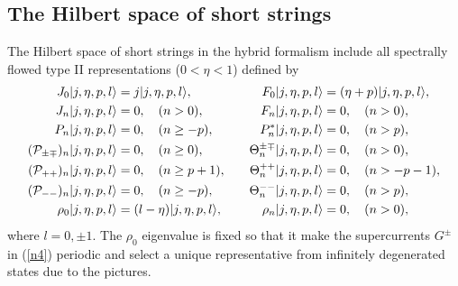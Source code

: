 \documentclass[a4paper,seceq,preprint]{ptptex}
\begin{document}
\subsection{The Hilbert space of short strings}\label{short}

The Hilbert space of short strings in the hybrid formalism include
all spectrally flowed type II representations\cite{KK} ($0<\eta<1$)
defined by
\begin{alignat}{2}
 J_0|j,\eta,p,l\rangle&=j|j,\eta,p,l\rangle,&\qquad
 F_0|j,\eta,p,l\rangle&=(\eta+p)|j,\eta,p,l\rangle,\nonumber\\
 J_n|j,\eta,p,l\rangle&=0,\quad (n>0),&\quad
 F_n|j,\eta,p,l\rangle&=0,\quad (n>0),\nonumber\\
 P_n|j,\eta,p,l\rangle&=0,\quad (n\ge-p),&\quad
 P^*_n|j,\eta,p,l\rangle&=0,\quad (n>p),\nonumber\\
 ({\cal P}_{\pm\mp})_n|j,\eta,p,l\rangle&=0,\quad (n\ge0),&\quad
 \Theta^{\pm\mp}_n|j,\eta,p,l\rangle&=0,\quad (n>0),\nonumber\\
 ({\cal P}_{++})_n|j,\eta,p,l\rangle&=0,\quad (n\ge p+1),&\quad
 \Theta^{++}_n|j,\eta,p,l\rangle&=0,\quad (n>-p-1),\nonumber\\
 ({\cal P}_{--})_n|j,\eta,p,l\rangle&=0,\quad (n\ge-p),&\quad
 \Theta^{--}_n|j,\eta,p,l\rangle&=0,\quad (n>p),\nonumber\\
 \rho_0|j,\eta,p,l\rangle&=(l-\eta)|j,\eta,p,l\rangle,&\quad
 \rho_n|j,\eta,p,l\rangle&=0,\quad (n>0),
\label{typeii}
\end{alignat}
where $l=0,\pm 1$. The $\rho_0$ eigenvalue is fixed so that 
it make the supercurrents $G^\pm$ in (\ref{n4}) periodic
and select a unique representative from infinitely 
degenerated states due to the pictures. 
\end{document}
